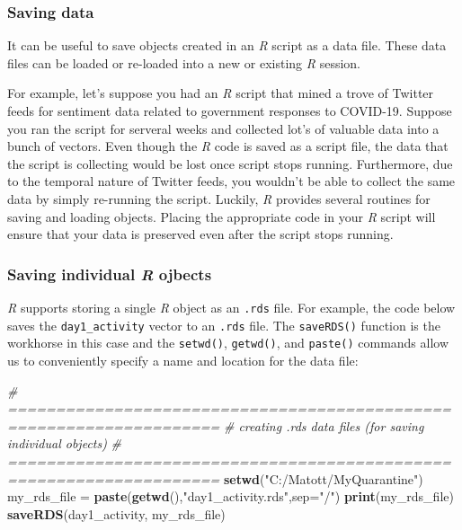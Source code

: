 \documentclass[
]{book}
\newenvironment{Shaded}{\begin{snugshade}}{\end{snugshade}}
\newcommand{\CommentTok}[1]{\textcolor[rgb]{0.56,0.35,0.01}{\textit{#1}}}
\newcommand{\DataTypeTok}[1]{\textcolor[rgb]{0.13,0.29,0.53}{#1}}
\newcommand{\KeywordTok}[1]{\textcolor[rgb]{0.13,0.29,0.53}{\textbf{#1}}}
\newcommand{\NormalTok}[1]{#1}
\newcommand{\StringTok}[1]{\textcolor[rgb]{0.31,0.60,0.02}{#1}}
\begin{document}
\hypertarget{saving-data}{%
\subsubsection*{Saving data}\label{saving-data}}

It can be useful to save objects created in an \emph{R} script as a data file. These data files can be loaded or re-loaded into a new or existing \emph{R} session.

For example, let's suppose you had an \emph{R} script that mined a trove of Twitter feeds for sentiment data related to government responses to COVID-19. Suppose you ran the script for serveral weeks and collected lot's of valuable data into a bunch of vectors. Even though the \emph{R} code is saved as a script file, the data that the script is collecting would be lost once script stops running. Furthermore, due to the temporal nature of Twitter feeds, you wouldn't be able to collect the same data by simply re-running the script. Luckily, \emph{R} provides several routines for saving and loading objects. Placing the appropriate code in your \emph{R} script will ensure that your data is preserved even after the script stops running.

\hypertarget{saving-individual-r-ojbects}{%
\subsubsection*{\texorpdfstring{Saving individual \emph{R} ojbects}{Saving individual R ojbects}}\label{saving-individual-r-ojbects}}

\emph{R} supports storing a single \emph{R} object as an \texttt{.rds} file. For example, the code below saves the \texttt{day1\_activity} vector to an \texttt{.rds} file. The \texttt{saveRDS()} function is the workhorse in this case and the \texttt{setwd()}, \texttt{getwd()}, and \texttt{paste()} commands allow us to conveniently specify a name and location for the data file:

\begin{Shaded}
\begin{Highlighting}[]
\CommentTok{# ====================================================================}
\CommentTok{# creating .rds data files (for saving individual objects)}
\CommentTok{# ====================================================================}
\KeywordTok{setwd}\NormalTok{(}\StringTok{"C:/Matott/MyQuarantine"}\NormalTok{)}
\NormalTok{my_rds_file =}\StringTok{ }\KeywordTok{paste}\NormalTok{(}\KeywordTok{getwd}\NormalTok{(),}\StringTok{"day1_activity.rds"}\NormalTok{,}\DataTypeTok{sep=}\StringTok{"/"}\NormalTok{)}
\KeywordTok{print}\NormalTok{(my_rds_file)}
\KeywordTok{saveRDS}\NormalTok{(day1_activity, my_rds_file)}
\end{Highlighting}
\end{Shaded}
\end{document}
